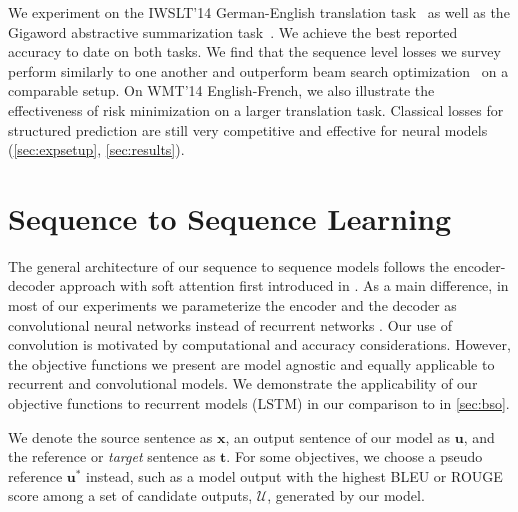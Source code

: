 \documentclass[11pt,a4paper]{article}
\newcommand{\source}{\mathbf{x}}
\newcommand{\pseudoreference}{\mathbf{u}^*}
\newcommand{\goldreference}{\mathbf{t}}
\newcommand{\candhypos}{\mathcal{U}}
\newcommand{\candhypo}{\mathbf{u}}
\begin{document}
We experiment on the IWSLT'14 German-English translation task~\citep{cettolo2014report} as well as the Gigaword abstractive summarization task~\citep{rush2015abs}.
We achieve the best reported accuracy to date on both tasks.
We find that the sequence level losses we survey perform similarly to one another and outperform beam search optimization~\citep{wiseman2016acl} on a comparable setup.
On WMT'14 English-French, we also illustrate the effectiveness of risk minimization on a larger translation task.
Classical losses for structured prediction are still very competitive and effective for neural models (\textsection\ref{sec:expsetup}, \textsection\ref{sec:results}).


\section{Sequence to Sequence Learning}
\label{sec:model}

The general architecture of our sequence to sequence models follows the encoder-decoder approach with soft attention first introduced in \cite{bahdanau2014neural}.
As a main difference, in most of our experiments we parameterize the encoder and the decoder as convolutional neural networks instead of recurrent networks \citep{gehring2016convolutional,gehring2017icml}. Our use of convolution is motivated by computational and accuracy considerations. However, the objective functions we present are model agnostic and equally applicable to recurrent and convolutional models. We demonstrate the applicability of our objective functions to recurrent models (LSTM) in our comparison to \citet{wiseman2016acl} in \textsection\ref{sec:bso}.

\smallskip
{} We denote the source sentence as $\source$, an output sentence of our model as $\candhypo$, and the reference or \emph{target} sentence as $\goldreference$.
For some objectives, we choose a pseudo reference $\pseudoreference$ instead, such as a model output with the highest BLEU or ROUGE score among a set of candidate outputs, $\candhypos$, generated by our model.
\end{document}
